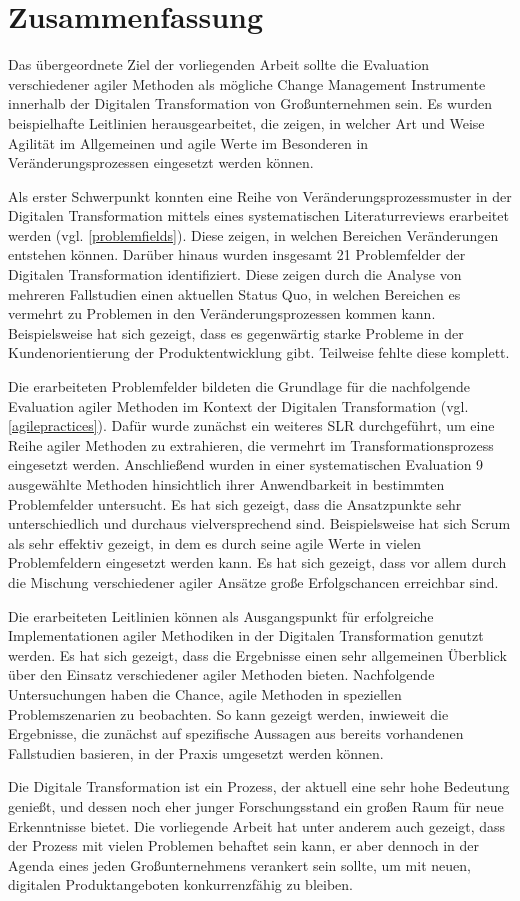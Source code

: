 \chapter{Zusammenfassung}
\label{conclusion}

Das übergeordnete Ziel der vorliegenden Arbeit sollte die Evaluation verschiedener agiler Methoden als mögliche Change Management Instrumente innerhalb der Digitalen Transformation von Großunternehmen sein. Es wurden beispielhafte Leitlinien herausgearbeitet, die zeigen, in welcher Art und Weise Agilität im Allgemeinen und agile Werte im Besonderen in Veränderungsprozessen eingesetzt werden können.

Als erster Schwerpunkt konnten eine Reihe von Veränderungsprozessmuster in der Digitalen Transformation mittels eines systematischen Literaturreviews erarbeitet werden (vgl. \ref{problemfields}). Diese zeigen, in welchen Bereichen Veränderungen entstehen können. Darüber hinaus wurden insgesamt 21 Problemfelder der Digitalen Transformation identifiziert. Diese zeigen durch die Analyse von mehreren Fallstudien einen aktuellen Status Quo, in welchen Bereichen es vermehrt zu Problemen in den Veränderungsprozessen kommen kann. Beispielsweise hat sich gezeigt, dass es gegenwärtig starke Probleme in der Kundenorientierung der Produktentwicklung gibt. Teilweise fehlte diese komplett.

Die erarbeiteten Problemfelder bildeten die Grundlage für die nachfolgende Evaluation agiler Methoden im Kontext der Digitalen Transformation (vgl.  \ref{agilepractices}). Dafür wurde zunächst ein weiteres SLR durchgeführt, um eine Reihe agiler Methoden zu extrahieren, die vermehrt im Transformationsprozess eingesetzt werden. Anschließend wurden in einer systematischen Evaluation 9 ausgewählte Methoden hinsichtlich ihrer Anwendbarkeit in bestimmten Problemfelder untersucht. Es hat sich gezeigt, dass die Ansatzpunkte sehr unterschiedlich und durchaus vielversprechend sind. Beispielsweise hat sich Scrum als sehr effektiv gezeigt, in dem es durch seine agile Werte in vielen Problemfeldern eingesetzt werden kann. Es hat sich gezeigt, dass vor allem durch die Mischung verschiedener agiler Ansätze große Erfolgschancen erreichbar sind.

Die erarbeiteten Leitlinien können als Ausgangspunkt für erfolgreiche Implementationen agiler Methodiken in der Digitalen Transformation genutzt werden. Es hat sich gezeigt, dass die Ergebnisse einen sehr allgemeinen Überblick über den Einsatz verschiedener agiler Methoden bieten. Nachfolgende Untersuchungen haben die Chance, agile Methoden in speziellen Problemszenarien zu beobachten. So kann gezeigt werden, inwieweit die Ergebnisse, die zunächst auf spezifische Aussagen aus bereits vorhandenen Fallstudien basieren, in der Praxis umgesetzt werden können. 

Die Digitale Transformation ist ein Prozess, der aktuell eine sehr hohe Bedeutung genießt, und dessen noch eher junger Forschungsstand ein großen Raum für neue Erkenntnisse bietet. Die vorliegende Arbeit hat unter anderem auch gezeigt, dass der Prozess mit vielen Problemen behaftet sein kann, er aber dennoch in der Agenda eines jeden Großunternehmens verankert sein sollte, um mit neuen, digitalen Produktangeboten konkurrenzfähig zu bleiben.